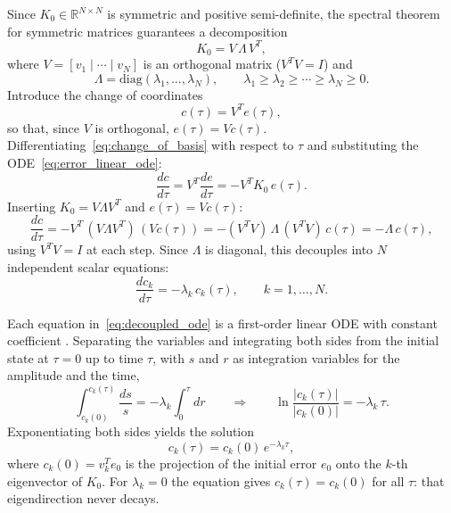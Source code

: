 Since $K_0 \in \mathbb{R}^{N \times N}$ is symmetric and positive semi-definite, the spectral theorem for symmetric matrices \parencite{strang2006, golub2013} guarantees a decomposition
\begin{equation}\label{eq:spectral_decomp}
    K_0 = V\,\Lambda\,V^T,
\end{equation}
where $V = [v_1 \mid \cdots \mid v_{N}]$ is an orthogonal matrix ($V^T V = I$) and
\begin{equation*}
    \Lambda = \mathrm{diag}(\lambda_1,\ldots,\lambda_{N}), \qquad \lambda_1 \geq \lambda_2 \geq \cdots \geq \lambda_{N} \geq 0.
\end{equation*}
Introduce the change of coordinates
\begin{equation}\label{eq:change_of_basis}
    c(\tau) = V^T e(\tau),
\end{equation}
so that, since $V$ is orthogonal, $e(\tau) = V c(\tau)$. Differentiating~\eqref{eq:change_of_basis} with respect to $\tau$ and substituting the ODE~\eqref{eq:error_linear_ode}:
\begin{equation*}
    \frac{dc}{d\tau} = V^T \frac{de}{d\tau} = -V^T K_0\,e(\tau).
\end{equation*}
Inserting $K_0 = V\Lambda V^T$ and $e(\tau) = Vc(\tau)$:
\begin{equation*}
    \frac{dc}{d\tau}
    = -V^T\,(V\Lambda V^T)\,(Vc(\tau))
    = -(V^T V)\,\Lambda\,(V^T V)\,c(\tau)
    = -\Lambda\,c(\tau),
\end{equation*}
using $V^T V = I$ at each step. Since $\Lambda$ is diagonal, this decouples into $N$ independent scalar equations:
\begin{equation}\label{eq:decoupled_ode}
    \frac{dc_k}{d\tau} = -\lambda_k\,c_k(\tau), \qquad k = 1,\ldots,N.
\end{equation}

Each equation in~\eqref{eq:decoupled_ode} is a first-order linear ODE with constant coefficient \parencite{boyce2012}. Separating the variables and integrating both sides from the initial state at $\tau = 0$ up to time $\tau$, with $s$ and $r$ as integration variables for the amplitude and the time,
\begin{equation*}
    \int_{c_k(0)}^{c_k(\tau)} \frac{ds}{s}
    = -\lambda_k \int_0^{\tau} dr
    \qquad\Longrightarrow\qquad
    \ln\frac{|c_k(\tau)|}{|c_k(0)|} = -\lambda_k\,\tau.
\end{equation*}
Exponentiating both sides yields the solution
\begin{equation}\label{eq:error_mode}
    c_k(\tau) = c_k(0)\,e^{-\lambda_k\tau},
\end{equation}
where $c_k(0) = v_k^T e_0$ is the projection of the initial error $e_0$ onto the $k$-th eigenvector of $K_0$. For $\lambda_k = 0$ the equation gives $c_k(\tau) = c_k(0)$ for all $\tau$: that eigendirection never decays.

